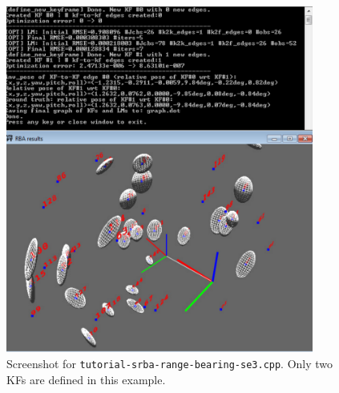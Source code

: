\documentclass[a4paper,11pt]{article}
\begin{document}
\begin{figure}[h]
\centering
\includegraphics[width=0.9\textwidth]{imgs/screenshot_tutorial_range-bearing-3D.pdf} 
\caption{Screenshot for \texttt{tutorial-srba-range-bearing-se3.cpp}. Only two KFs are defined in this example.}
\label{fig:screenshot.tutorial1}
\end{figure}

\newpage
\end{document}
